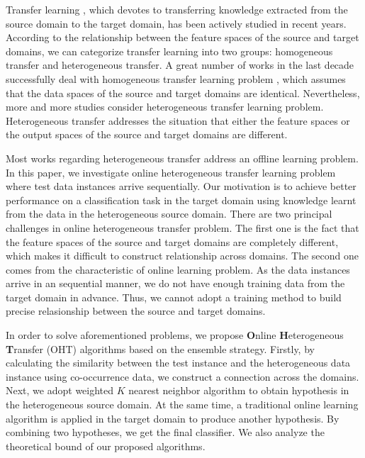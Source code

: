 \documentclass[letterpaper]{article}
\theoremstyle{remark}
\theoremstyle{definition}
\begin{document}
Transfer learning \cite{pan2010survey}, which devotes to transferring knowledge extracted from the source domain to the target domain, has been actively studied in recent years.
According to the relationship between the feature spaces of the source and target domains, we can categorize transfer learning into two groups: homogeneous transfer and heterogeneous transfer.
A great number of works in the last decade successfully deal with homogeneous transfer learning problem \cite{liao2005logistic,dai2007boosting,dai2007transferring,eaton2011selective}, which assumes that the data spaces of the source and target domains are identical.
Nevertheless, more and more studies consider heterogeneous transfer learning problem.
Heterogeneous transfer addresses the situation that either the feature spaces or the output spaces of the source and target domains are different.

Most works regarding heterogeneous transfer address an offline learning problem.
In this paper, we investigate online heterogeneous transfer learning problem where test data instances arrive sequentially.
Our motivation is to achieve better performance on a classification task in the target domain using knowledge learnt from the data in the heterogeneous source domain.
There are two principal challenges in online heterogeneous transfer problem.
The first one is the fact that the feature spaces of the source and target domains are completely different, which makes it difficult to construct relationship across domains.
The second one comes from the characteristic of online learning problem.
As the data instances arrive in an sequential manner, we do not have enough training data from the target domain in advance.
Thus, we cannot adopt a training method to build precise relasionship between the source and target domains.

In order to solve aforementioned problems, we propose \textbf{O}nline \textbf{H}eterogeneous \textbf{T}ransfer (OHT) algorithms based on the ensemble strategy.
Firstly, by calculating the similarity between the test instance and the heterogeneous data instance using co-occurrence data, we construct a connection across the domains.
Next, we adopt weighted $K$ nearest neighbor algorithm to obtain hypothesis in the heterogeneous source domain.
At the same time, a traditional online learning algorithm is applied in the target domain to produce another hypothesis.
By combining two hypotheses, we get the final classifier.
We also analyze the theoretical bound of our proposed algorithms.
\end{document}
